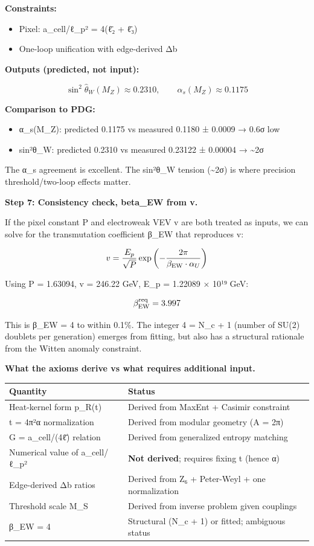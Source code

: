 \textbf{Constraints:}

\begin{itemize}
\tightlist
\item
  Pixel: a\_cell/ℓ\_p² = 4(\={ℓ}₂ + \={ℓ}₃)
\item
  One-loop unification with edge-derived Δb
\end{itemize}

\textbf{Outputs (predicted, not input):}

\[
\sin^2\hat{\theta}_W(M_Z) \approx 0.2310, \qquad \alpha_s(M_Z) \approx 0.1175
\]

\textbf{Comparison to PDG:}

\begin{itemize}
\tightlist
\item
  α\_s(M\_Z): predicted 0.1175 vs measured 0.1180 ± 0.0009 → 0.6σ low
\item
  sin²θ\_W: predicted 0.2310 vs measured 0.23122 ± 0.00004 → \textasciitilde2σ
\end{itemize}

The α\_s agreement is excellent. The sin²θ\_W tension (\textasciitilde2σ) is where precision threshold/two-loop effects matter.

\textbf{Step 7: Consistency check, beta\_EW from v.}

If the pixel constant P and electroweak VEV v are both treated as inputs, we can solve for the transmutation coefficient β\_EW that reproduces v:

\[
v = \frac{E_p}{\sqrt{P}} \exp\left(-\frac{2\pi}{\beta_{\rm EW} \cdot \alpha_U}\right)
\]

Using P = 1.63094, v = 246.22 GeV, E\_p = 1.22089 × 10¹⁹ GeV:

\[
\beta_{\rm EW}^{\rm req} = 3.997
\]

This is β\_EW = 4 to within 0.1\%. The integer 4 = N\_c + 1 (number of SU(2) doublets per generation) emerges from fitting, but also has a structural rationale from the Witten anomaly constraint.

\textbf{What the axioms derive vs what requires additional input.}

{\def\LTcaptype{none} %
\begin{longtable}[]{@{}ll@{}}
\toprule\noalign{}
Quantity & Status \\
\midrule\noalign{}
\endhead
\bottomrule\noalign{}
\endlastfoot
Heat-kernel form p\_R(t) & Derived from MaxEnt + Casimir constraint \\
t = 4π²α normalization & Derived from modular geometry (A = 2π) \\
G = a\_cell/(4\={ℓ}) relation & Derived from generalized entropy matching \\
Numerical value of a\_cell/ℓ\_p² & \textbf{Not derived}; requires fixing t (hence α) \\
Edge-derived Δb ratios & Derived from Z₆ + Peter-Weyl + one normalization \\
Threshold scale M\_S & Derived from inverse problem given couplings \\
β\_EW = 4 & Structural (N\_c + 1) or fitted; ambiguous status \\
\end{longtable}
}


